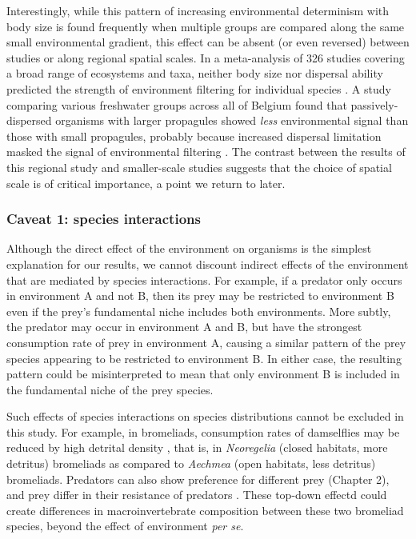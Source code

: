 Interestingly, while this pattern of increasing environmental
determinism with body size is found frequently when multiple groups are
compared along the same small environmental gradient, this effect can be
absent (or even reversed) between studies or along regional spatial
scales. In a meta-analysis of 326 studies covering a broad range of
ecosystems and taxa, neither body size nor dispersal ability predicted
the strength of environment filtering for individual species
\citep{Soininen2014}. A study comparing various freshwater groups across
all of Belgium found that passively-dispersed organisms with larger
propagules showed \emph{less} environmental signal than those with small
propagules, probably because increased dispersal limitation masked the
signal of environmental filtering \citep{DeBie2012a}. The contrast
between the results of this regional study and smaller-scale studies
suggests that the choice of spatial scale is of critical importance, a
point we return to later.

\subsubsection{Caveat 1: species
interactions}\label{caveat-1-species-interactions}

Although the direct effect of the environment on organisms is the
simplest explanation for our results, we cannot discount indirect
effects of the environment that are mediated by species interactions.
For example, if a predator only occurs in environment A and not B, then
its prey may be restricted to environment B even if the prey's
fundamental niche includes both environments. More subtly, the predator
may occur in environment A and B, but have the strongest consumption
rate of prey in environment A, causing a similar pattern of the prey
species appearing to be restricted to environment B. In either case, the
resulting pattern could be misinterpreted to mean that only environment
B is included in the fundamental niche of the prey species.

Such effects of species interactions on species distributions cannot be
excluded in this study. For example, in bromeliads, consumption rates of
damselflies may be reduced by high detrital density
\citep{Klecka2014, Srivastava2006a}, that is, in \emph{Neoregelia}
(closed habitats, more detritus) bromeliads as compared to
\emph{Aechmea} (open habitats, less detritus) bromeliads. Predators can
also show preference for different prey (Chapter 2), and prey differ in
their resistance of predators \citep{Hammill2015}. These top-down
effectd could create differences in macroinvertebrate composition
between these two bromeliad species, beyond the effect of environment
\emph{per se}.

